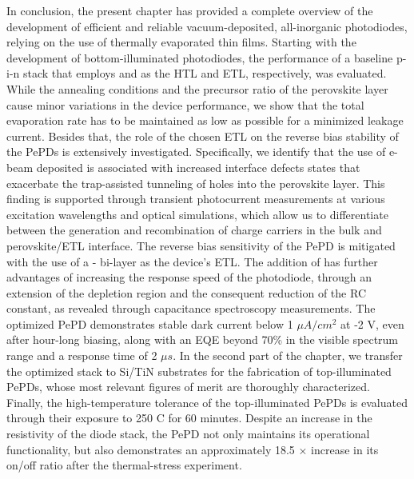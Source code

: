 In conclusion, the present chapter has provided a complete overview of the development of efficient and reliable vacuum-deposited, all-inorganic photodiodes, relying on the use of thermally evaporated  thin films. Starting with the development of bottom-illuminated photodiodes, the performance of a baseline p-i-n stack that employs  and  as the HTL and ETL, respectively, was evaluated. While the annealing conditions and the precursor ratio of the perovskite layer cause minor variations in the device performance, we show that the total evaporation rate has to be maintained as low as possible for a minimized leakage current. Besides that, the role of the chosen ETL on the reverse bias stability of the PePDs is extensively investigated. Specifically, we identify that the use of e-beam deposited  is associated with increased interface defects states that exacerbate the trap-assisted tunneling of holes into the perovskite layer. This finding is supported through transient photocurrent measurements at various excitation wavelengths and optical simulations, which allow us to differentiate between the generation and recombination of charge carriers in the bulk and perovskite/ETL interface.  The reverse bias sensitivity of the PePD is mitigated with the use of a - bi-layer as the device's ETL. The addition of  has further advantages of increasing the response speed of the photodiode, through an extension of the depletion region and the consequent reduction of the RC constant, as revealed through capacitance spectroscopy measurements. The optimized PePD demonstrates stable dark current below 1 $\mu A/cm^2$ at -2 V, even after hour-long biasing, along with an EQE beyond 70\% in the visible spectrum range and a response time of 2 $\mu s$. In the second part of the chapter, we transfer the optimized stack to Si/TiN substrates for the fabrication of top-illuminated PePDs, whose most relevant figures of merit are thoroughly characterized. Finally, the high-temperature tolerance of the top-illuminated PePDs is evaluated through their exposure to 250 \degree C for 60 minutes. Despite an increase in the resistivity of the diode stack, the PePD not only maintains its operational functionality, but also demonstrates an approximately 18.5 $\times$ increase in its on/off ratio after the thermal-stress experiment.


\cleardoublepage

